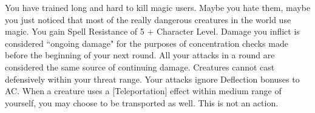 {You have trained long and hard to kill magic users. Maybe you hate them, maybe you just noticed that most of the really dangerous creatures in the world use magic.}
{You gain Spell Resistance of 5 + Character Level.}
{Damage you inflict is considered ``ongoing damage" for the purposes of concentration checks made before the beginning of your next round. All your attacks in a round are considered the same source of continuing damage.}
{Creatures cannot cast defensively within your threat range.}
{Your attacks ignore Deflection bonuses to AC.}
{When a creature uses a [Teleportation] effect within medium range of yourself, you may choose to be transported as well. This is not an action.}